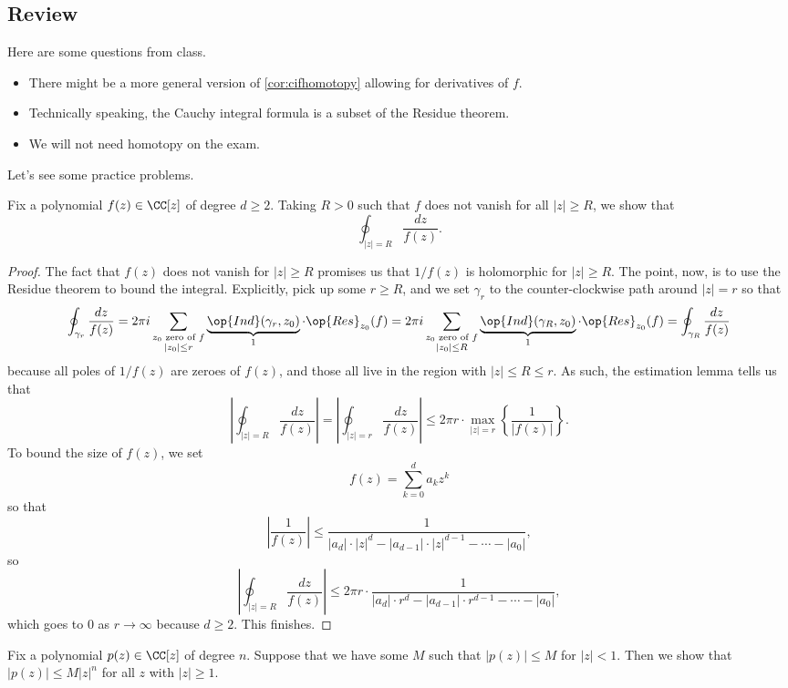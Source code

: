 \subsection{Review}
Here are some questions from class.
\begin{itemize}
	\item There might be a more general version of \autoref{cor:cifhomotopy} allowing for derivatives of $f$.
	\item Technically speaking, the Cauchy integral formula is a subset of the Residue theorem.
	\item We will not need homotopy on the exam.
\end{itemize}
Let's see some practice problems.
\begin{exe}
	Fix a polynomial $f(z)\in\CC[z]$ of degree $d\ge2$. Taking $R>0$ such that $f$ does not vanish for all $|z|\ge R$, we show that
	\[\oint_{|z|=R}\frac{dz}{f(z)}.\]
\end{exe}
\begin{proof}
	The fact that $f(z)$ does not vanish for $|z|\ge R$ promises us that $1/f(z)$ is holomorphic for $|z|\ge R$. The point, now, is to use the Residue theorem to bound the integral. Explicitly, pick up some $r\ge R$, and we set $\gamma_r$ to the counter-clockwise path around $|z|=r$ so that
	\[\oint_{\gamma_r}\frac{dz}{f(z)}=2\pi i\sum_{\substack{z_0\text{ zero of }f\\|z_0|\le r}}\underbrace{\op{Ind}(\gamma_r,z_0)}_1\cdot\op{Res}_{z_0}(f)=2\pi i\sum_{\substack{z_0\text{ zero of }f\\|z_0|\le R}}\underbrace{\op{Ind}(\gamma_R,z_0)}_1\cdot\op{Res}_{z_0}(f)=\oint_{\gamma_R}\frac{dz}{f(z)}\]
	because all poles of $1/f(z)$ are zeroes of $f(z)$, and those all live in the region with $|z|\le R\le r$. As such, the estimation lemma tells us that
	\[\left|\oint_{|z|=R}\frac{dz}{f(z)}\right|=\left|\oint_{|z|=r}\frac{dz}{f(z)}\right|\le2\pi r\cdot\max_{|z|=r}\left\{\frac1{|f(z)|}\right\}.\]
	To bound the size of $f(z)$, we set
	\[f(z)=\sum_{k=0}^da_kz^k\]
	so that
	\[\left|\frac1{f(z)}\right|\le\frac1{|a_d|\cdot |z|^d-|a_{d-1}|\cdot|z|^{d-1}-\cdots-|a_0|},\]
	so
	\[\left|\oint_{|z|=R}\frac{dz}{f(z)}\right|\le2\pi r\cdot\frac1{|a_d|\cdot r^d-|a_{d-1}|\cdot r^{d-1}-\cdots-|a_0|},\]
	which goes to $0$ as $r\to\infty$ because $d\ge2$. This finishes.
\end{proof}
\begin{exe}
	Fix a polynomial $p(z)\in\CC[z]$ of degree $n$. Suppose that we have some $M$ such that $|p(z)|\le M$ for $|z|<1$. Then we show that $|p(z)|\le M|z|^n$ for all $z$ with $|z|\ge1$.
\end{exe}
